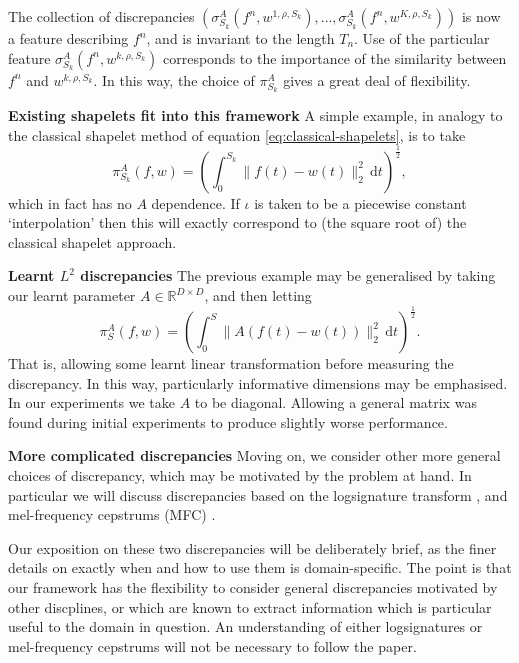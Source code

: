 \documentclass{article}
\theoremstyle{plain}
\theoremstyle{definition}
\newcommand{\reals}{\mathbb{R}}
\newcommand{\norm}[1]{\|#1\|}
\newcommand{\dee}{\,\mathrm{d}}
\newcommand{\boldheading}[1]{

\textbf{#1}\quad}
\begin{document}
	The collection of discrepancies $(\sigma^A_{S_k}(f^n, w^{1, \rho, S_k}), \ldots, \sigma^A_{S_k}(f^n, w^{K, \rho, S_k}))$ is now a feature describing $f^n$, and is invariant to the length $T_n$. Use of the particular feature $\sigma^A_{S_k}(f^n, w^{k, \rho, S_k})$ corresponds to the importance of the similarity between $f^n$ and $w^{k, \rho, S_k}$. In this way, the choice of $\pi^A_{S_k}$ gives a great deal of flexibility.
	
	\boldheading{Existing shapelets fit into this framework}
	A simple example, in analogy to the classical shapelet method of equation \eqref{eq:classical-shapelets}, is to take
	\begin{equation*}
	\pi^A_{S_k}(f, w) = (\int_{0}^{S_k} \norm{f(t) - w(t)}_2^2 \dee t)^{\frac{1}{2}},
	\end{equation*}
	which in fact has no $A$ dependence. If $\iota$ is taken to be a piecewise constant `interpolation' then this will exactly correspond to (the square root of) the classical shapelet approach.
	
	\boldheading{Learnt $L^2$ discrepancies}
	The previous example may be generalised by taking our learnt parameter $A \in \reals^{D \times D}$, and then letting
	\begin{equation}\label{eq:learnt-discrepancy}
	\pi^A_{S}(f, w) = (\int_{0}^{S} \norm{A(f(t) - w(t))}_2^2 \dee t)^{\frac{1}{2}}.
	\end{equation}
	That is, allowing some learnt linear transformation before measuring the discrepancy. In this way, particularly informative dimensions may be emphasised. In our experiments we take $A$ to be diagonal. Allowing a general matrix was found during initial experiments to produce slightly worse performance.
	
	\boldheading{More complicated discrepancies}
	Moving on, we consider other more general choices of discrepancy, which may be motivated by the problem at hand. In particular we will discuss discrepancies based on the logsignature transform \cite{logsig-rnn}, and mel-frequency cepstrums (MFC) \cite{mfc}.
	
	Our exposition on these two discrepancies will be deliberately brief, as the finer details on exactly when and how to use them is domain-specific. The point is that our framework has the flexibility to consider general discrepancies motivated by other discplines, or which are known to extract information which is particular useful to the domain in question. An understanding of either logsignatures or mel-frequency cepstrums will not be necessary to follow the paper.
	
\end{document}

